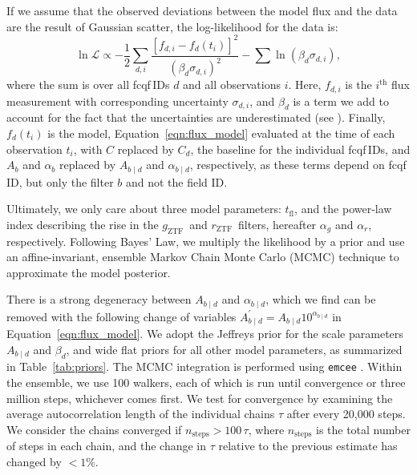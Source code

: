 \documentclass[twocolumn]{./aastex63}
\newcommand{\rztf}{$r_\mathrm{ZTF}$}
\newcommand{\gztf}{$g_\mathrm{ZTF}$}
\newcommand{\tfl}{$t_\mathrm{fl}$}
\begin{document}
If we assume that the observed deviations between the model flux and the data
are the result of Gaussian scatter, the log-likelihood for the data is:
%
\begin{equation}
    \ln \mathscr{L} \propto -\frac{1}{2}\sum_{d,i} \frac{[f_{d,i} - f_d(t_i)]^2}{(\beta_d \sigma_{d,i})^2} -\sum{\ln (\beta_d \sigma_{d,i})},
\end{equation}
%
where the sum is over all fcqf\,IDs $d$ and all observations $i$. Here,
$f_{d,i}$ is the $i^\mathrm{th}$ flux measurement with corresponding
uncertainty $\sigma_{d,i}$, and $\beta_d$ is a term we add to account for the
fact that the uncertainties are underestimated (see \citealt{Yao19}). Finally,
$f_d(t_i)$ is the model, Equation~\ref{eqn:flux_model} evaluated at the time
of each observation $t_i$, with $C$ replaced by $C_d$, the baseline for the
individual fcqf\,IDs, and $A_b$ and $\alpha_b$ replaced by $A_{b\mid d}$ and
$\alpha_{b\mid d}$, respectively, as these terms depend on fcqf\,ID, but only
the filter $b$ and not the field ID.

Ultimately, we only care about three model parameters: \tfl, and the power-law
index describing the rise in the \gztf\ and \rztf\ filters, hereafter
$\alpha_g$ and $\alpha_r$, respectively. Following Bayes' Law, we multiply the
likelihood by a prior and use an affine-invariant, ensemble Markov Chain Monte
Carlo (MCMC) technique \citep{Goodman10} to approximate the model posterior.

There is a strong degeneracy between $A_{b\mid d}$ and $\alpha_{b\mid d}$,
which we find can be removed with the following change of variables
$A^\prime_{b\mid d} = A_{b\mid d} 10^{\alpha_{b\mid d}}$ in
Equation~\ref{eqn:flux_model}. We adopt the Jeffreys prior \citep{Jeffreys46}
for the scale parameters $A_{b\mid d}$ and $\beta_d$, and wide flat priors for
all other model parameters, as summarized in Table~\ref{tab:priors}. The MCMC
integration is performed using \texttt{emcee} \citep{Foreman-Mackey13}. Within
the ensemble, we use 100 walkers, each of which is run until convergence or
three million steps, whichever comes first. We test for convergence by
examining the average autocorrelation length of the individual chains $\tau$
after every 20,000 steps. We consider the chains converged if
$n_\mathrm{steps} > 100 \,\tau$, where $n_\mathrm{steps}$ is the total number
of steps in each chain, and the change in $\tau$ relative to the previous
estimate has changed by $<1\%$.


\end{document}
